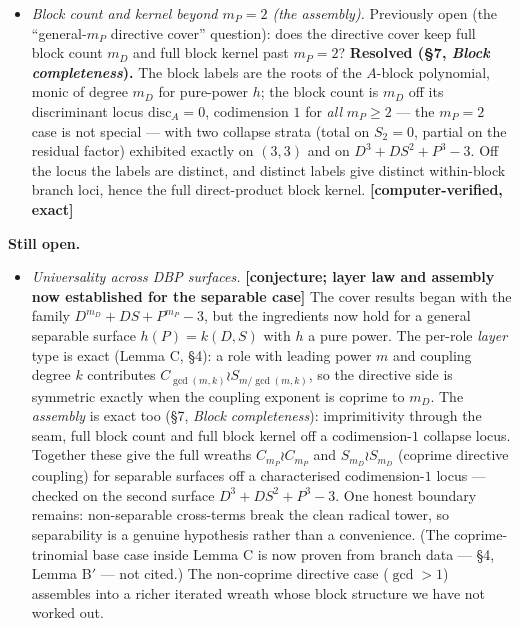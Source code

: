\documentclass[11pt]{article}
\providecommand{\tightlist}{\setlength{\itemsep}{0pt}\setlength{\parskip}{0pt}}
\theoremstyle{plain}
\theoremstyle{definition}
\theoremstyle{remark}
\begin{document}
\begin{itemize}
\item
  \emph{Block count and kernel beyond \(m_P=2\) (the assembly).} Previously open (the ``general-\(m_P\) directive cover'' question): does the directive cover keep full block count \(m_D\) and full block kernel past \(m_P=2\)? \textbf{Resolved (§7, \emph{Block completeness}).} The block labels are the roots of the \(A\)-block polynomial, monic of degree \(m_D\) for pure-power \(h\); the block count is \(m_D\) off its discriminant locus \(\mathrm{disc}_A=0\), codimension \(1\) for \emph{all} \(m_P\ge2\) --- the \(m_P=2\) case is not special --- with two collapse strata (total on \(S_2=0\), partial on the residual factor) exhibited exactly on \((3,3)\) and on \(D^3+DS^2+P^3-3\). Off the locus the labels are distinct, and distinct labels give distinct within-block branch loci, hence the full direct-product block kernel. \textbf{{[}computer-verified, exact{]}}
\end{itemize}

\textbf{Still open.}

\begin{itemize}
\tightlist
\item
  \emph{Universality across DBP surfaces.} \textbf{{[}conjecture; layer law and assembly now established for the separable case{]}} The cover results began with the family \(D^{m_D}+DS+P^{m_P}-3\), but the ingredients now hold for a general separable surface \(h(P)=k(D,S)\) with \(h\) a pure power. The per-role \emph{layer} type is exact (Lemma C, §4): a role with leading power \(m\) and coupling degree \(k\) contributes \(C_{\gcd(m,k)}\wr S_{m/\gcd(m,k)}\), so the directive side is symmetric exactly when the coupling exponent is coprime to \(m_D\). The \emph{assembly} is exact too (§7, \emph{Block completeness}): imprimitivity through the seam, full block count and full block kernel off a codimension-\(1\) collapse locus. Together these give the full wreaths \(C_{m_P}\wr C_{m_P}\) and \(S_{m_D}\wr S_{m_D}\) (coprime directive coupling) for separable surfaces off a characterised codimension-\(1\) locus --- checked on the second surface \(D^3+DS^2+P^3-3\). One honest boundary remains: non-separable cross-terms break the clean radical tower, so separability is a genuine hypothesis rather than a convenience. (The coprime-trinomial base case inside Lemma C is now proven from branch data --- §4, Lemma B\('\) --- not cited.) The non-coprime directive case (\(\gcd>1\)) assembles into a richer iterated wreath whose block structure we have not worked out.
\end{itemize}
\end{document}
